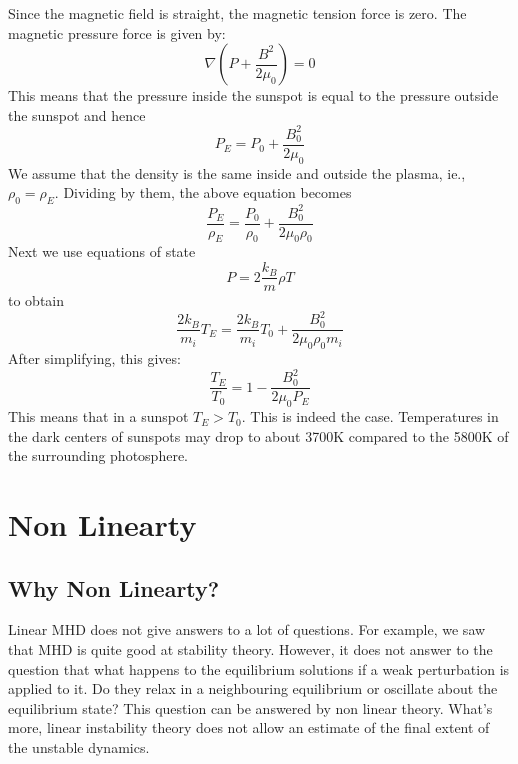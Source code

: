 \documentclass[12pt]{article}
\newenvironment{changemargin}[2]{%
\begin{list}{}{%
\setlength{\topsep}{0pt}%
\setlength{\leftmargin}{#1}%
\setlength{\rightmargin}{#2}%
\setlength{\listparindent}{\parindent}%
\setlength{\itemindent}{\parindent}%
\setlength{\parsep}{\parskip}%
}%
\item[]}{\end{list}}
\begin{document}
\begin{changemargin}{-2cm}{-2cm}
    Since the magnetic field is straight, the magnetic tension force is zero. The magnetic pressure force is given by:
    \begin{equation}
        \nabla \left(P+{\frac {B^{2}}{2\mu _{0}}}\right) = 0
    \end{equation}
    This means that the pressure inside the sunspot is equal to the pressure outside the sunspot and hence
    \begin{equation}
        P_E = P_0 + \frac{B_0^2}{2\mu_0}
    \end{equation}
    We assume that the density is the same inside and outside the plasma, ie., $\rho_0 = \rho_E$. Dividing by them, the above equation becomes
    \begin{equation}
        \frac{P_E}{\rho_E} = \frac{P_0}{\rho_0} + \frac{B_0^2}{2\mu_0\rho_0}
    \end{equation}
    Next we use equations of state
    \begin{equation}
        P = 2\frac{k_B}{m}\rho T
    \end{equation}
    to obtain
    \begin{equation}
        \frac{2k_B}{m_i}T_E = \frac{2k_B}{m_i}T_0 + \frac{B_0^2}{2\mu_0\rho_0m_i}
    \end{equation}
    After simplifying, this gives:
    \begin{equation}\label{eq:sunspot-temp}
        \frac{T_E}{T_0} = 1 - \frac{B_0^2}{2\mu_0P_E}
    \end{equation}
    This means that in a sunspot $T_E>T_0$. This is indeed the case. Temperatures in the dark centers of sunspots may drop to about 3700K compared to the 5800K of the surrounding photosphere.

    \section{Non Linearty}
    \subsection{Why Non Linearty?}
    Linear MHD does not give answers to a lot of questions. For example, we saw that MHD is quite good at stability theory. However, it does not answer to the question that what happens to the equilibrium solutions if a weak perturbation is applied to it. Do they relax in a neighbouring equilibrium or oscillate about the equilibrium state? This question can be answered by non linear theory. What's more, linear instability theory does not allow an estimate of the final extent of the unstable dynamics.


\end{changemargin}
\end{document}
